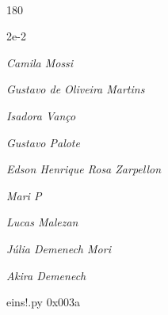 \documentclass[12pt]{article}
\begin{document}

\pagebreak			

	\ 
	\vfill
	\begin{turn}{180}	
		\begin{minipage}{\textwidth}
		  	\ttfamily %
			\centering
			{\Huge 2e-2}
		  
			\hfill
		  
			

\textit{\small Camila Mossi}

\textit{\small Gustavo de Oliveira Martins}

\textit{\small Isadora Vanço}

\textit{\small Gustavo Palote}

\textit{\small Edson Henrique Rosa Zarpellon}

\textit{\small Mari P}

\textit{\small Lucas Malezan}

\textit{\small Júlia Demenech Mori}

\textit{\small Akira Demenech}

\bigskip

eins!.py
0x003a


		\end{minipage}	
	\end{turn}
	\vfill
	\

\pagebreak
\end{document}
